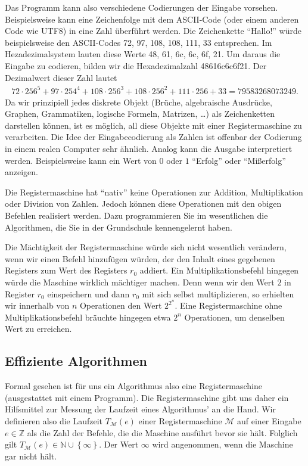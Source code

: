 \documentclass[10pt,reqno]{amsart}
\numberwithin{equation}{section}
\newcommand\cM{\mathcal M}
\newcommand\NN{\mathbb N}
\newcommand\ZZ{\mathbb Z}
\newcommand\cbc[1]{\left\{{#1}\right\}}
\begin{document}
Das Programm kann also verschiedene Codierungen der Eingabe vorsehen.
Beispielsweise kann eine Zeichenfolge mit dem ASCII-Code (oder einem anderen Code wie UTF8) in eine Zahl \"uberf\"uhrt werden.
Die Zeichenkette ``Hallo!'' w\"urde beispielsweise den ASCII-Codes 72, 97, 108, 108, 111, 33 entsprechen.
Im Hezadezimalsystem lauten diese Werte 48, 61, 6c, 6c, 6f, 21.
Um daraus die Eingabe zu codieren, bilden wir die Hexadezimalzahl 48616c6c6f21.
Der Dezimalwert dieser Zahl lautet
\begin{align*}
72\cdot256^5+97\cdot254^4+108\cdot256^3+108\cdot256^2+111\cdot256+33=79583268073249.
\end{align*}
Da wir prinzipiell jedes diskrete Objekt (Br\"uche, algebraische Ausdr\"ucke, Graphen, Grammatiken, logische Formeln, Matrizen, \ldots) als Zeichenketten darstellen k\"onnen, ist es m\"oglich, all diese Objekte mit einer Registermaschine zu verarbeiten.
Die Idee der Eingabecodierung als Zahlen ist offenbar der Codierung in einem realen Computer sehr \"ahnlich. 
Analog kann die Ausgabe interpretiert werden.
Beispielsweise kann ein Wert von $0$ oder $1$ ``Erfolg'' oder ``Mi\ss erfolg'' anzeigen.

Die Registermaschine hat ``nativ'' keine Operationen zur Addition, Multiplikation oder Division von Zahlen.
Jedoch k\"onnen diese Operationen mit den obigen Befehlen realisiert werden.
Dazu programmieren Sie im wesentlichen die Algorithmen, die Sie in der Grundschule kennengelernt haben.

Die M\"achtigkeit der Registermaschine w\"urde sich nicht wesentlich ver\"andern, wenn wir einen Befehl hinzuf\"ugen w\"urden, der den Inhalt eines gegebenen Registers zum Wert des Registers $r_0$ addiert.
Ein Multiplikationsbefehl hingegen w\"urde die Maschine wirklich m\"achtiger machen.
Denn wenn wir den Wert $2$ in Register $r_0$ einspeichern und dann $r_0$ mit sich selbst multiplizieren, so erhielten wir innerhalb von $n$ Operationen den Wert $2^{2^n}$.
Eine Registermaschine ohne Multiplikationsbefehl br\"auchte hingegen etwa $2^n$ Operationen, um denselben Wert zu erreichen.

\subsection{Effiziente Algorithmen}\label{sec_P}
Formal gesehen ist f\"ur uns ein Algorithmus also eine Registermaschine (ausgestattet mit einem Programm).
Die Registermaschine gibt uns daher ein Hilfsmittel zur Messung der Laufzeit eines Algorithmus' an die Hand.
Wir definieren also die Laufzeit $T_{\cM}(e)$ einer Registermaschine $\cM$ auf einer Eingabe $e\in\ZZ$ als die Zahl der Befehle, die die Maschine ausf\"uhrt bevor sie h\"alt.
Folglich gilt $T_\cM(e)\in\NN\cup\cbc\infty$.
Der Wert $\infty$ wird angenommen, wenn die Maschine gar nicht h\"alt.
\end{document}
